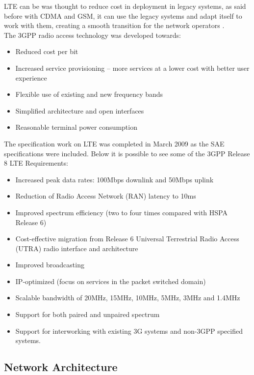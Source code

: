 LTE can be was thought to reduce cost in deployment in legacy systems, as said
before with CDMA and GSM, it can use the legacy systems and adapt itself to work
with them, creating a smooth transition for the network operators \cite{introlte}.\\

The 3GPP radio access  technology was developed towards:

\begin{itemize}
    \item Reduced cost per bit
    \item Increased service provisioning – more services at a lower cost with
    better user experience
    \item Flexible use of existing and new frequency bands
    \item Simplified architecture and open interfaces
    \item Reasonable terminal power consumption
\end{itemize}

The specification work on LTE was completed in March 2009 as the SAE specifications
were included. Below it is possible to see some of the 3GPP Release 8 LTE Requirements:

\begin{itemize}
    \item Increased peak data rates: 100Mbps downlink and 50Mbps uplink
    \item Reduction of Radio Access Network (RAN) latency to 10ms
    \item Improved spectrum efficiency (two to four times compared with HSPA Release 6)
    \item Cost-effective migration from Release 6 Universal Terrestrial Radio
    Access (UTRA) radio interface and architecture
    \item Improved broadcasting
    \item IP-optimized (focus on services in the packet switched domain)
    \item Scalable bandwidth of 20MHz, 15MHz, 10MHz, 5MHz, 3MHz and 1.4MHz
    \item Support for both paired and unpaired spectrum
    \item Support for interworking with existing 3G systems and non-3GPP specified systems.
\end{itemize}

\subsection{Network Architecture}

